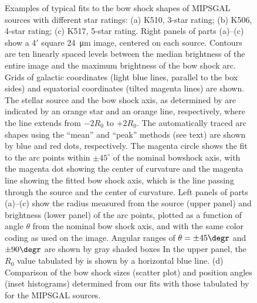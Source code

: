 \begin{figure}
  \caption[]{Examples of typical fits to the bow shock shapes of
    MIPSGAL sources with different star ratings: (a) K510, 3-star
    rating; (b) K506, 4-star rating; (c) K517, 5-star rating.  Right
    panels of parts (a)--(c) show a 4\('\) square \SI{24}{\um} image,
    centered on each source.  Contours are ten linearly spaced levels
    between the median brightness of the entire image and the maximum
    brightness of the bow shock arc. Grids of galactic coordinates
    (light blue lines, parallel to the box sides) and equatorial
    coordinates (tilted magenta lines) are shown.  The stellar source
    and the bow shock axis, as determined by \citet{Kobulnicky:2016a}
    are indicated by an orange star and an orange line, respectively,
    where the line extends from \(-2 R_0\) to \(+2 R_0\).  The
    automatically traced arc shapes using the ``mean'' and ``peak''
    methods (see text) are shown by blue and red dots, respectively.
    The magenta circle shows the fit to the arc points within
    \(\pm 45^\circ\) of the nominal bowshock axis, with the magenta dot
    showing the center of curvature and the magenta line showing the
    fitted bow shock axis, which is the line passing through the
    source and the center of curvature.  Left panels of parts (a)--(c)
    show the radius measured from the source (upper panel) and
    brightness (lower panel) of the arc points, plotted as a function
    of angle \(\theta\) from the nominal bow shock axis, and with the same
    color coding as used on the image. Angular ranges of
    \(\theta = \pm 45\degr\) and \(\pm 90\degr\) are shown by gray shaded
    boxes In the upper panel, the \(R_0\) value tabulated by
    \citet{Kobulnicky:2016a} is shown by a horizontal blue line. (d)
    Comparison of the bow shock sizes (scatter plot) and position
    angles (inset histograms) determined from our fits with those
    tabulated by \citet{Kobulnicky:2016a} for the MIPSGAL sources.}
  \label{fig:mipsgal-examples}
\end{figure}



